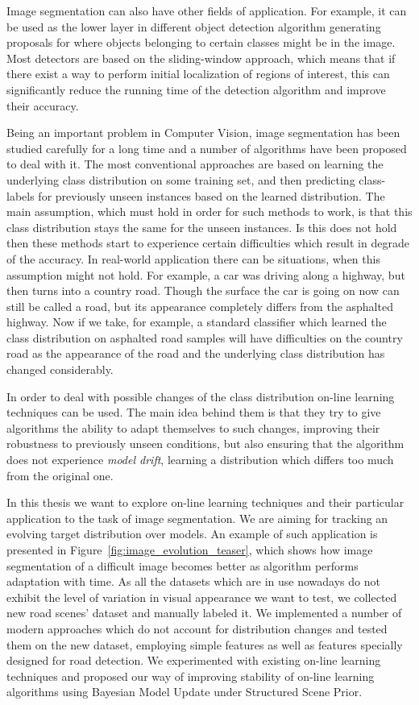 Image segmentation can also have other fields of application. For example, it can be used as the lower layer in different object detection algorithm
generating proposals for where objects belonging to certain classes might be in the image. Most detectors are based on the sliding-window approach,
which means that if there exist a way to perform initial localization of regions of interest, this can significantly reduce the running time of the
detection algorithm and improve their accuracy.

Being an important problem in Computer Vision, image segmentation has been studied carefully for a long time and a number of algorithms have been
proposed to deal with it. The most conventional approaches are based on learning the underlying class distribution on some training set, and then
predicting class-labels for previously unseen instances based on the learned distribution. The main assumption, which must hold in order for such 
methods to work, is that this class distribution stays the same for the unseen instances. Is this does not hold then these methods start to experience 
certain difficulties which result in degrade of the accuracy. In real-world application there can be situations, when this assumption might not hold. 
For example, a car was driving along a highway, but then 
turns into a country road. Though the surface the car is going on now can still be called a road, but its appearance completely differs from
the asphalted highway. Now if we take, for example, a standard classifier which learned the class distribution on asphalted road samples will
have difficulties on the country road as the appearance of the road and the underlying class distribution has changed considerably.

In order to deal with possible changes of the class distribution on-line learning techniques can be used. The main idea behind them is that
they try to give algorithms the ability to adapt themselves to such changes, improving their robustness to previously unseen conditions, but
also ensuring that the algorithm does not experience \emph{model drift}, \ie learning a distribution which differs too much from the original one.

In this thesis we want to explore on-line learning techniques and their particular application to the task of image segmentation. 
We are aiming for tracking an evolving target distribution over models. An example of such application is presented in 
Figure~\ref{fig:image_evolution_teaser}, which shows how image segmentation of a difficult image becomes better as algorithm performs adaptation with time.
As all the 
datasets which are in use nowadays do not exhibit the level of variation in visual appearance we want to test, we collected new road scenes' dataset
and manually labeled it. We implemented a number of modern approaches which do not account for distribution changes and tested them on the 
new dataset, employing simple features as well as features specially designed for road detection. We experimented with existing
on-line learning techniques and proposed our way of improving stability of on-line learning algorithms using Bayesian Model Update 
under Structured Scene Prior.

